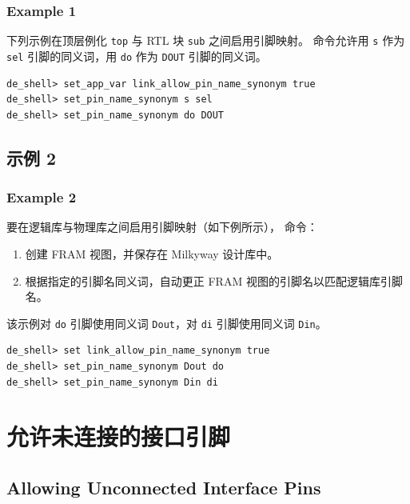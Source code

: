 \subsubsection*{Example 1}

下列示例在顶层例化 \texttt{top} 与 RTL 块 \texttt{sub} 之间启用引脚映射。
 命令允许用 \texttt{s} 作为 \texttt{sel} 引脚的同义词，用 \texttt{do} 作为 \texttt{DOUT} 引脚的同义词。
\begin{lstlisting}
de_shell> set_app_var link_allow_pin_name_synonym true
de_shell> set_pin_name_synonym s sel
de_shell> set_pin_name_synonym do DOUT
\end{lstlisting}


\subsection{示例 2}
\subsubsection*{Example 2}

要在逻辑库与物理库之间启用引脚映射（如下例所示）， 命令：
\begin{enumerate}
  \item 创建 FRAM 视图，并保存在 Milkyway 设计库中。
  \item 根据指定的引脚名同义词，自动更正 FRAM 视图的引脚名以匹配逻辑库引脚名。
\end{enumerate}

该示例对 \texttt{do} 引脚使用同义词 \texttt{Dout}，对 \texttt{di} 引脚使用同义词 \texttt{Din}。
\begin{lstlisting}
de_shell> set link_allow_pin_name_synonym true
de_shell> set_pin_name_synonym Dout do
de_shell> set_pin_name_synonym Din di
\end{lstlisting}


\section{允许未连接的接口引脚}
\subsection*{Allowing Unconnected Interface Pins}

